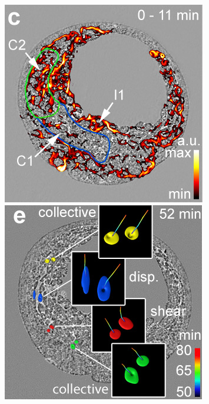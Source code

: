 \documentclass{beamer}
\begin{document}
\begin{frame}
\begin{columns}
    \vfill
    \includegraphics[width=\imw]{figures/analysis-overview/flow-diff}
    \vfill
    \includegraphics[width=\imw]{figures/analysis-overview/flow-int}

    

  \end{columns}
\end{frame}
\end{document}

